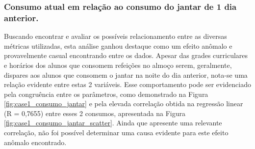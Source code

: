                 \subsubsection{Consumo atual em relação ao consumo do jantar de 1 dia anterior.}
                
                Buscando encontrar e avaliar os possíveis relacionamento entre as diversas métricas utilizadas, esta análise ganhou destaque como um efeito anômalo e provavelmente casual encontrando entre os dados.
                Apesar das grades curriculares e horários dos alunos que consomem refeições no almoço serem, geralmente, dispares aos alunos que consomem o jantar na noite do dia anterior, nota-se uma relação evidente entre estas 2 variáveis.
                 Esse comportamento pode ser evidenciado pela congruência entre os parâmetros, como demonstrado na Figura \ref{fig:case1_consumo_jantar} e pela elevada correlação obtida na regressão linear (R = 0,7655) entre esses 2 consumos, apresentada na Figura  \ref{fig:case1_consumo_jantar_scatter}. Ainda que apresente uma relevante correlação, não foi possível determinar uma causa evidente para este efeito anômalo encontrado.

                
  
                \begin{figure}[H]
                \end{figure} 
               
